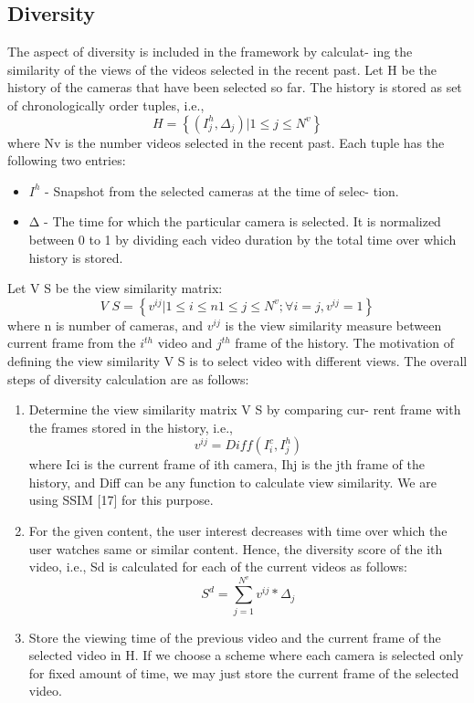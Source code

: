 \documentclass{sig-alternate}
\begin{document}
\subsection{Diversity}
The aspect of diversity is included in the framework by calculat-
ing the similarity of the views of the videos selected in the recent
past. Let H be the history of the cameras that have been selected
so far. The history is stored as set of chronologically order tuples,
i.e.,
\begin{equation}
H = \left\{\left(I_j^h,\Delta_j \right)|1\leq j\leq N^v\right\}
\end{equation}
where Nv is the number videos selected in the recent past. Each
tuple has the following two entries:
\begin{itemize}
    \item $I^h$ - Snapshot from the selected cameras at the time of selec-
tion.
    \item Δ - The time for which the particular camera is selected. It
is normalized between 0 to 1 by dividing each video duration
by the total time over which history is stored.
\end{itemize}
Let V S be the view similarity matrix:
\begin{equation}
\textit{V S} = \left\{v^{ij}|1\leq i\leq n 1 \leq j \leq N^v;\forall i=j,v^{ij}=1 \right\}
\end{equation}
where n is number of cameras, and $v^{ij}$ is the view similarity
measure between current frame from the $i^{th}$ video and $j^{th}$ frame
of the history. The motivation of defining the view similarity V S is
to select video with different views. The overall steps of diversity
calculation are as follows:
\begin{enumerate}
    \item Determine the view similarity matrix V S by comparing cur-
rent frame with the frames stored in the history, i.e.,
\begin{equation}
v^{ij} = Diff(I_i^c,I_j^h)
\end{equation}
where Ici is the current frame of ith camera, Ihj is the jth frame of the history, and Diff can be any function to calculate view similarity. We are using SSIM [17] for this purpose.
    \item For the given content, the user interest decreases with time
over which the user watches same or similar content. Hence,
the diversity score of the ith video, i.e., Sd is calculated for each of the current videos as follows:
\begin{equation}
S^d = \sum_{j=1}^{N^v}v^{ij}*\Delta_j
\end{equation}
    \item Store the viewing time of the previous video and the current
frame of the selected video in H. If we choose a scheme
where each camera is selected only for fixed amount of time,
we may just store the current frame of the selected video.
\end{enumerate}
\end{document}
